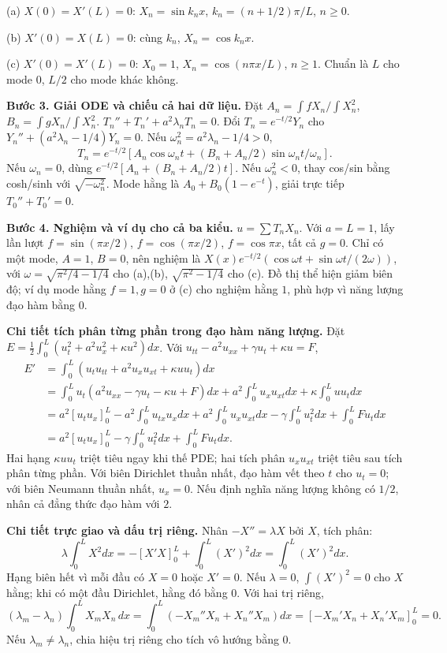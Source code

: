 (a) $X(0)=X'(L)=0$: $X_n=\sin k_nx$, $k_n=(n+1/2)\pi/L$, $n\ge0$.

(b) $X'(0)=X(L)=0$: cùng $k_n$, $X_n=\cos k_nx$.

(c) $X'(0)=X'(L)=0$: $X_0=1$, $X_n=\cos(n\pi x/L)$, $n\ge1$. Chuẩn là $L$ cho mode $0$, $L/2$ cho mode khác không.

\textbf{Bước 3. Giải ODE và chiếu cả hai dữ liệu.} Đặt $A_n=\int fX_n/\int X_n^2$, $B_n=\int gX_n/\int X_n^2$. $T_n''+T_n'+a^2\lambda_nT_n=0$. Đổi $T_n=e^{-t/2}Y_n$ cho $Y_n''+(a^2\lambda_n-1/4)Y_n=0$. Nếu $\omega_n^2=a^2\lambda_n-1/4>0$,
\[T_n=e^{-t/2}[A_n\cos\omega_nt+(B_n+A_n/2)\sin\omega_nt/\omega_n].\]
Nếu $\omega_n=0$, dùng $e^{-t/2}[A_n+(B_n+A_n/2)t]$. Nếu $\omega_n^2<0$, thay cos/sin bằng cosh/sinh với $\sqrt{-\omega_n^2}$. Mode hằng là $A_0+B_0(1-e^{-t})$, giải trực tiếp $T_0''+T_0'=0$.

\textbf{Bước 4. Nghiệm và ví dụ cho cả ba kiểu.} $u=\sum T_nX_n$. Với $a=L=1$, lấy lần lượt $f=\sin(\pi x/2)$, $f=\cos(\pi x/2)$, $f=\cos\pi x$, tất cả $g=0$. Chỉ có một mode, $A=1$, $B=0$, nên nghiệm là $X(x)e^{-t/2}(\cos\omega t+\sin\omega t/(2\omega))$, với $\omega=\sqrt{\pi^2/4-1/4}$ cho (a),(b), $\sqrt{\pi^2-1/4}$ cho (c). Đồ thị thể hiện giảm biên độ; ví dụ mode hằng $f=1,g=0$ ở (c) cho nghiệm hằng $1$, phù hợp vì năng lượng đạo hàm bằng $0$.

\textbf{Chi tiết tích phân từng phần trong đạo hàm năng lượng.} Đặt $E=\frac12\int_0^L(u_t^2+a^2u_x^2+\kappa u^2)dx$. Với $u_{tt}-a^2u_{xx}+\gamma u_t+\kappa u=F$,
\[\begin{aligned}
E'&=\int_0^L(u_tu_{tt}+a^2u_xu_{xt}+\kappa uu_t)dx\\
&=\int_0^Lu_t(a^2u_{xx}-\gamma u_t-\kappa u+F)dx
+a^2\int_0^Lu_xu_{xt}dx+\kappa\int_0^Luu_tdx\\
&=a^2[u_tu_x]_0^L-a^2\int_0^Lu_{tx}u_xdx
+a^2\int_0^Lu_xu_{xt}dx-\gamma\int_0^Lu_t^2dx+\int_0^LFu_tdx\\
&=a^2[u_tu_x]_0^L-\gamma\int_0^Lu_t^2dx+\int_0^LFu_tdx.
\end{aligned}\]
Hai hạng $\kappa uu_t$ triệt tiêu ngay khi thế PDE; hai tích phân $u_xu_{xt}$ triệt tiêu sau tích phân từng phần. Với biên Dirichlet thuần nhất, đạo hàm vết theo $t$ cho $u_t=0$; với biên Neumann thuần nhất, $u_x=0$. Nếu định nghĩa năng lượng không có $1/2$, nhân cả đẳng thức đạo hàm với $2$.

\textbf{Chi tiết trực giao và dấu trị riêng.} Nhân $-X''=\lambda X$ bởi $X$, tích phân:
\[\lambda\int_0^LX^2dx=-[X'X]_0^L+\int_0^L(X')^2dx=\int_0^L(X')^2dx.\]
Hạng biên hết vì mỗi đầu có $X=0$ hoặc $X'=0$. Nếu $\lambda=0$, $\int(X')^2=0$ cho $X$ hằng; khi có một đầu Dirichlet, hằng đó bằng $0$. Với hai trị riêng,
\[(\lambda_m-\lambda_n)\int_0^LX_mX_n\,dx
=\int_0^L(-X_m''X_n+X_n''X_m)dx
=[-X_m'X_n+X_n'X_m]_0^L=0.\]
Nếu $\lambda_m\ne\lambda_n$, chia hiệu trị riêng cho tích vô hướng bằng $0$.

